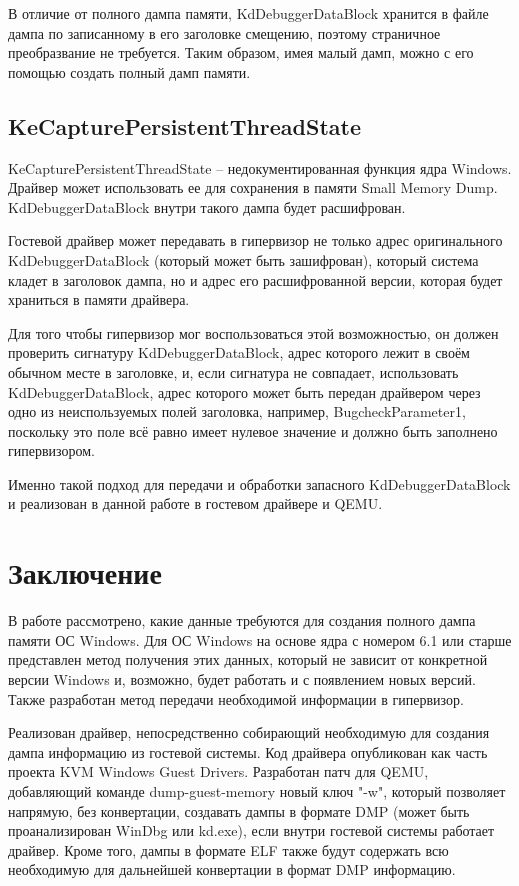 \documentclass{mipt-thesis-bs}
\begin{document}
В отличие от полного дампа памяти, KdDebuggerDataBlock хранится в файле дампа по записанному в его заголовке смещению, поэтому страничное преобразвание не требуется. Таким образом, имея малый дамп, можно с его помощью создать полный дамп памяти.

\section*{KeCapturePersistentThreadState}

KeCapturePersistentThreadState -- недокументированная функция ядра Windows. Драйвер может использовать ее для сохранения в памяти Small Memory Dump. KdDebuggerDataBlock внутри такого дампа будет расшифрован.

Гостевой драйвер может передавать в гипервизор не только адрес оригинального KdDebuggerDataBlock (который может быть зашифрован), который система кладет в заголовок дампа, но и адрес его расшифрованной версии, которая будет храниться в памяти драйвера.

Для того чтобы гипервизор мог воспользоваться этой возможностью, он должен проверить сигнатуру KdDebuggerDataBlock, адрес которого лежит в своём обычном месте в заголовке, и, если сигнатура не совпадает, использовать KdDebuggerDataBlock, адрес которого может быть передан драйвером через одно из неиспользуемых полей заголовка, например, BugcheckParameter1, поскольку это поле всё равно имеет нулевое значение и должно быть заполнено гипервизором.

Именно такой подход для передачи и обработки запасного KdDebuggerDataBlock и реализован в данной работе в гостевом драйвере и QEMU.

\chapter{Заключение}

В работе рассмотрено, какие данные требуются для создания полного дампа памяти ОС Windows. Для ОС Windows на основе ядра с номером 6.1 или старше представлен метод получения этих данных, который не зависит от конкретной версии Windows и, возможно, будет работать и с появлением новых версий. Также разработан метод передачи необходимой информации в гипервизор.

Реализован драйвер, непосредственно собирающий необходимую для создания дампа информацию из гостевой системы. Код драйвера опубликован как часть проекта KVM Windows Guest Drivers.
Разработан патч для QEMU, добавляющий команде dump-guest-memory новый ключ "-w", который позволяет напрямую, без конвертации, создавать дампы в формате DMP (может быть проанализирован WinDbg или kd.exe), если внутри гостевой системы работает драйвер. Кроме того, дампы в формате ELF также будут содержать всю необходимую для дальнейшей конвертации в формат DMP информацию.
\end{document}
